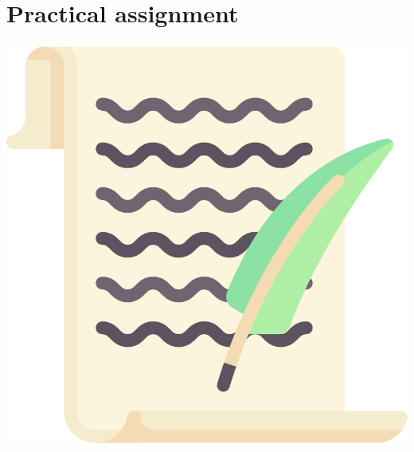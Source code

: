 
\begin{minipage}{0.8\textwidth}
\section{Practical assignment}
\end{minipage}%
\hfill%
\begin{minipage}{0.1\textwidth}
\includegraphics[width=\linewidth]{Files/Images/lettericon.pdf}
\end{minipage}
\vspace*{.1cm}

